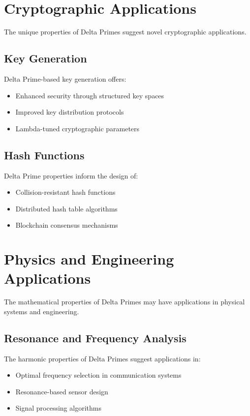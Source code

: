 \documentclass[12pt,a4paper]{report}
\begin{document}
\begin{itemize}
\section{Cryptographic Applications}

The unique properties of Delta Primes suggest novel cryptographic applications.

\subsection{Key Generation}

Delta Prime-based key generation offers:
\begin{itemize}
\item Enhanced security through structured key spaces
\item Improved key distribution protocols
\item Lambda-tuned cryptographic parameters
\end{itemize}

\subsection{Hash Functions}

Delta Prime properties inform the design of:
\begin{itemize}
\item Collision-resistant hash functions
\item Distributed hash table algorithms
\item Blockchain consensus mechanisms
\end{itemize}

\section{Physics and Engineering Applications}

The mathematical properties of Delta Primes may have applications in physical systems and engineering.

\subsection{Resonance and Frequency Analysis}

The harmonic properties of Delta Primes suggest applications in:
\begin{itemize}
\item Optimal frequency selection in communication systems
\item Resonance-based sensor design
\item Signal processing algorithms
\end{itemize}


\end{itemize}
\end{document}
